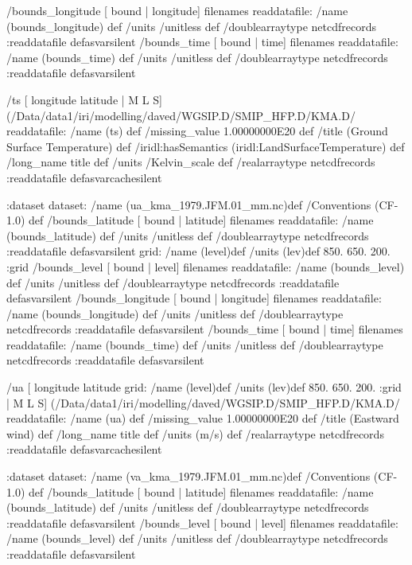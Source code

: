  /bounds_longitude{
[ bound | longitude] filenames readdatafile:
/name (bounds_longitude) def
 /units /unitless def
 /doublearraytype netcdfrecords :readdatafile
}defasvarsilent
 /bounds_time{
[ bound | time] filenames readdatafile:
/name (bounds_time) def
 /units /unitless def
 /doublearraytype netcdfrecords :readdatafile
}defasvarsilent
\begin{ingrid}
 /ts{
[ longitude latitude | M L S]
(/Data/data1/iri/modelling/daved/WGSIP.D/SMIP_HFP.D/KMA.D/%
 readdatafile:
/name (ts) def
 /missing_value 1.00000000E20 def
 /title (Ground Surface Temperature) def
/iridl:hasSemantics (iridl:LandSurfaceTemperature) def
 /long_name title def /units /Kelvin_scale def
 /realarraytype netcdfrecords :readdatafile
}defasvarcachesilent
\end{ingrid}
:dataset
dataset:
/name (ua_kma_1979.JFM.01_mm.nc)def
 /Conventions (CF-1.0) def
 /bounds_latitude{
[ bound | latitude] filenames readdatafile:
/name (bounds_latitude) def
 /units /unitless def
 /doublearraytype netcdfrecords :readdatafile
}defasvarsilent
grid:
/name (level)def
/units (lev)def
 850. 650. 200.
:grid
 /bounds_level{
[ bound | level] filenames readdatafile:
/name (bounds_level) def
 /units /unitless def
 /doublearraytype netcdfrecords :readdatafile
}defasvarsilent
 /bounds_longitude{
[ bound | longitude] filenames readdatafile:
/name (bounds_longitude) def
 /units /unitless def
 /doublearraytype netcdfrecords :readdatafile
}defasvarsilent
 /bounds_time{
[ bound | time] filenames readdatafile:
/name (bounds_time) def
 /units /unitless def
 /doublearraytype netcdfrecords :readdatafile
}defasvarsilent
\begin{ingrid}
 /ua{
[ longitude latitude 
grid:
/name (level)def
/units (lev)def
 850. 650. 200.
:grid
| M L S]
(/Data/data1/iri/modelling/daved/WGSIP.D/SMIP_HFP.D/KMA.D/%
readdatafile:
/name (ua) def
 /missing_value 1.00000000E20 def
 /title (Eastward wind) def
 /long_name title def /units (m/s) def
 /realarraytype netcdfrecords :readdatafile
}defasvarcachesilent
\end{ingrid}
:dataset
dataset:
/name (va_kma_1979.JFM.01_mm.nc)def
 /Conventions (CF-1.0) def
 /bounds_latitude{
[ bound | latitude] filenames readdatafile:
/name (bounds_latitude) def
 /units /unitless def
 /doublearraytype netcdfrecords :readdatafile
}defasvarsilent
 /bounds_level{
[ bound | level] filenames readdatafile:
/name (bounds_level) def
 /units /unitless def
 /doublearraytype netcdfrecords :readdatafile
}defasvarsilent
